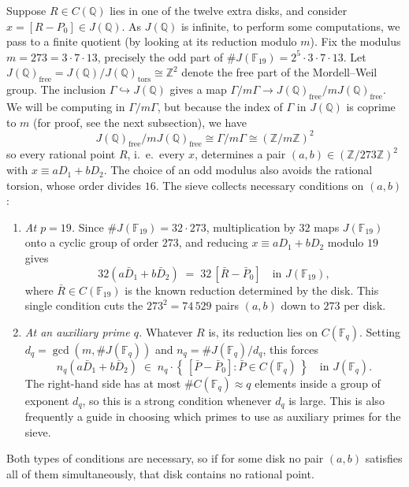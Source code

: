 \documentclass{article}
\theoremstyle{plain}
\newcommand{\Z}{\mathbb{Z}}
\newcommand{\Q}{\mathbb{Q}}
\newcommand{\F}{\mathbb{F}}
\newcommand{\tors}{\mathrm{tors}}
\begin{document}
Suppose $R\in C(\Q)$ lies in one of the twelve extra disks, and consider
$x=[R-P_0]\in J(\Q)$. As \(J(\Q)\) is infinite, to perform some computations, we pass to a finite quotient (by looking at its reduction modulo \(m\)). Fix the modulus
\(  m = 273 = 3\cdot 7\cdot 13 \),
precisely the odd part of $\#J(\F_{19})=2^5\cdot 3\cdot 7\cdot 13$.
Let \( J(\Q)_{\mathrm{free}} = J(\Q)/J(\Q)_{\tors} \cong \Z^2 \) denote the free part of the Mordell--Weil group. The inclusion \(\Gamma \hookrightarrow J(\Q)\) gives a map \(\Gamma/m\Gamma \to J(\Q)_{\mathrm{free}}/mJ(\Q)_{\mathrm{free}}\). We will be computing in \( \Gamma/m\Gamma\), but because the index of $\Gamma$ in \(J(\Q)\) is coprime to \(m\) (for proof, see the next subsection), we have %
\[
  J(\Q)_{\mathrm{free}}/mJ(\Q)_{\mathrm{free}} \cong \Gamma/m\Gamma \cong (\Z/m\Z)^2
\]
so every rational point \(R\), i.~e.~every $x$, determines a pair $(a,b)\in(\Z/273\Z)^2$ with
$x\equiv aD_1+bD_2$. The choice of an odd modulus also avoids the rational torsion, whose order divides \(16\). The sieve collects necessary conditions on $(a,b)$:

\begin{enumerate}
\item[(C1)] \emph{At $p=19$.} Since \( \#J(\F_{19}) = 32\cdot 273\), multiplication by $32$ maps
$J(\F_{19})$ onto a cyclic group of order $273$, and reducing
$x\equiv aD_1+bD_2$ modulo $19$ gives
\[
  32\left(a\bar D_1+b\bar D_2\right) \;=\; 32\,[\bar R-\bar P_0]
  \quad\text{in } J(\F_{19}),
\]
where $\bar R\in C(\F_{19})$ is the known reduction determined by the disk.
This single condition cuts the $273^2=74\,529$ pairs $(a,b)$ down to $273$
per disk.
\item[(C2)] \emph{At an auxiliary prime $q$.} Whatever $R$ is, its reduction lies on
$C(\F_q)$. Setting $d_q=\gcd(m,\#J(\F_q))$ and $n_q=\#J(\F_q)/d_q$, this forces
\[
  n_q\left(a\bar D_1+b\bar D_2\right)\;\in\;
  n_q\cdot\left\{\,[\bar P-\bar P_0] : \bar P\in C(\F_q)\,\right\}
  \quad\text{in } J(\F_q).
\]
The right-hand side has at most $\#C(\F_q)\approx q$ elements inside a group of
exponent $d_q$, so this is a strong condition whenever $d_q$ is large. This is also frequently a guide in choosing which primes to use as auxiliary primes for the sieve.
\end{enumerate}

Both types of conditions are necessary, so if for some disk
no pair $(a,b)$ satisfies all of them simultaneously, that disk contains
no rational point.
\end{document}
